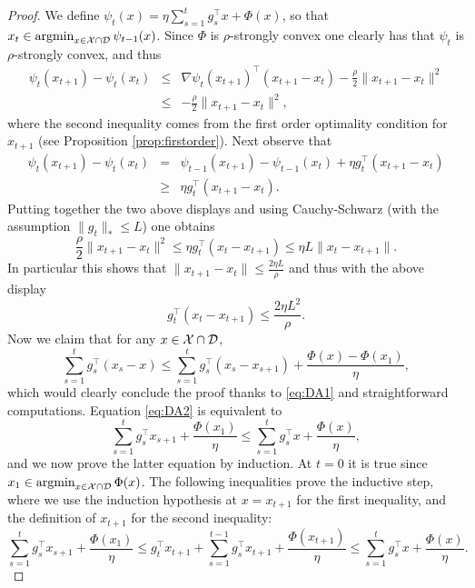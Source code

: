 \begin{proof}
We define $\psi_t(x) = \eta \sum_{s=1}^{t} g_s^{\top} x + \Phi(x)$, so that $x_t \in  \mathop{\mathrm{argmin}}_{x \in \mathcal{X} \cap \mathcal{D}} \psi_{t-1}(x)$. Since $\Phi$ is $\rho$-strongly convex one clearly has that $\psi_t$ is $\rho$-strongly convex, and thus
\begin{eqnarray*}
\psi_t(x_{t+1}) - \psi_t(x_t) & \leq & \nabla \psi_t(x_{t+1})^{\top}(x_{t+1} - x_{t}) - \frac{\rho}{2} \|x_{t+1} - x_t\|^2 \\
& \leq & - \frac{\rho}{2} \|x_{t+1} - x_t\|^2 ,
\end{eqnarray*}
where the second inequality comes from the first order optimality condition for $x_{t+1}$ (see Proposition \ref{prop:firstorder}). Next observe that
\begin{eqnarray*}
\psi_t(x_{t+1}) - \psi_t(x_t) & = & \psi_{t-1}(x_{t+1}) - \psi_{t-1}(x_t) + \eta g_t^{\top} (x_{t+1} - x_t) \\
& \geq & \eta g_t^{\top} (x_{t+1} - x_t) .
\end{eqnarray*}
Putting together the two above displays and using Cauchy-Schwarz (with the assumption $\|g_t\|_* \leq L$) one obtains
$$\frac{\rho}{2} \|x_{t+1} - x_t\|^2 \leq \eta g_t^{\top} (x_t - x_{t+1}) \leq \eta L \|x_t - x_{t+1} \|.$$
In particular this shows that $\|x_{t+1} - x_t\| \leq \frac{2 \eta L}{\rho}$ and thus with the above display
\begin{equation} \label{eq:DA1}
g_t^{\top} (x_t - x_{t+1}) \leq \frac{2 \eta L^2}{\rho} .
\end{equation}
Now we claim that for any $x \in \mathcal{X} \cap \mathcal{D}$,
\begin{equation} \label{eq:DA2}
\sum_{s=1}^t g_s^{\top} (x_s - x) \leq \sum_{s=1}^t g_s^{\top} (x_s - x_{s+1}) + \frac{\Phi(x) - \Phi(x_1)}{\eta} ,
\end{equation}
which would clearly conclude the proof thanks to \eqref{eq:DA1} and straightforward computations. Equation \eqref{eq:DA2} is equivalent to 
$$\sum_{s=1}^t g_s^{\top} x_{s+1} + \frac{\Phi(x_1)}{\eta} \leq \sum_{s=1}^t g_s^{\top} x + \frac{\Phi(x)}{\eta} ,$$
and we now prove the latter equation by induction. At $t=0$ it is true since $x_1 \in \mathop{\mathrm{argmin}}_{x \in \mathcal{X} \cap \mathcal{D}} \Phi(x)$. The following inequalities prove the inductive step, where we use the induction hypothesis at $x=x_{t+1}$ for the first inequality, and the definition of $x_{t+1}$ for the second inequality:
$$\sum_{s=1}^{t} g_s^{\top} x_{s+1} + \frac{\Phi(x_1)}{\eta} \leq g_{t}^{\top}x_{t+1} + \sum_{s=1}^{t-1} g_s^{\top} x_{t+1} + \frac{\Phi(x_{t+1})}{\eta} \leq \sum_{s=1}^{t} g_s^{\top} x + \frac{\Phi(x)}{\eta} .$$
\end{proof}

